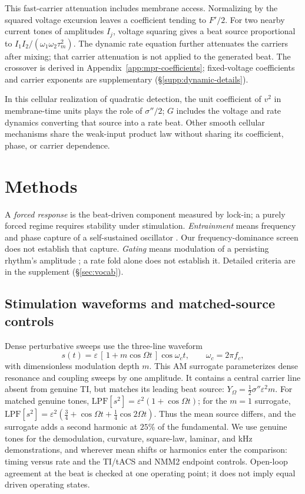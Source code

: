 \documentclass[11pt,a4paper]{article}
\newcommand{\Sig}{\sigma}
\newcommand{\half}{\tfrac{1}{2}}
\begin{document}
This fast-carrier attenuation includes membrane access. Normalizing by the
squared voltage excursion leaves a coefficient tending to $F'/2$.
For two nearby current tones of amplitudes $I_j$, voltage squaring gives a
beat source proportional to $I_1I_2/(\omega_1\omega_2\tau_m^2)$.
The dynamic rate equation further attenuates the carriers after mixing;
that carrier attenuation is not applied to the generated beat. The crossover is derived in
Appendix~\ref{app:mpr-coefficients}; fixed-voltage coefficients and carrier
exponents are supplementary (\S\ref{supp:dynamic-details}).

In this cellular realization of quadratic detection, the unit coefficient of $v^2$ in membrane-time units
plays the role of $\Sig''/2$; $G$ includes the voltage and rate dynamics
converting that source into a rate beat. Other smooth cellular mechanisms
share the weak-input product law without sharing its coefficient, phase,
or carrier dependence.

\section{Methods}

\label{sec:vocab-methods}
A \emph{forced response} is the beat-driven component measured by lock-in; a purely
forced regime requires stability under stimulation. \emph{Entrainment} means
frequency and phase capture of a self-sustained oscillator \cite{pikovsky2001}.
Our frequency-dominance screen does not establish that capture. \emph{Gating}
means modulation of a persisting rhythm's amplitude \cite{canolty2010,tort2010};
a rate fold alone does not establish it. Detailed criteria are in the supplement
(\S\ref{sec:vocab}).

\subsection{Stimulation waveforms and matched-source controls}\label{sec:waveforms}
Dense perturbative sweeps use the
three-line waveform
\begin{equation}
s(t)=\varepsilon\,[\,1+m\cos\Omega t\,]\cos\omega_c t,\qquad \omega_c=2\pi f_c ,
\label{eq:amsur}
\end{equation}
with dimensionless modulation depth $m$. This AM surrogate parameterizes dense
resonance and coupling sweeps by one amplitude. It contains a central carrier
line absent from genuine TI, but matches its leading beat source:
$Y_\Omega=\half\Sig''\varepsilon^2m$. For matched genuine tones,
$\mathrm{LPF}[s^2]=\varepsilon^2(1+\cos\Omega t)$; for the $m=1$ surrogate,
$\mathrm{LPF}[s^2]=\varepsilon^2(\tfrac34+\cos\Omega t+\tfrac14\cos2\Omega t)$.
Thus the mean source differs, and the surrogate adds a second harmonic at
$25\%$ of the fundamental. We use genuine tones for the demodulation,
curvature, square-law, laminar, and kHz demonstrations, and wherever mean shifts
or harmonics enter the comparison: timing versus rate and the TI/tACS and
NMM2 endpoint controls. Open-loop agreement at the beat is checked at one
operating point; it does not imply equal driven operating states.
\end{document}
